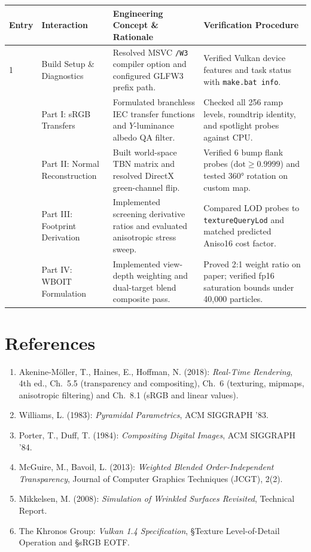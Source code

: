 \documentclass[10pt,a4paper]{article}
\begin{document}
\vspace{0.5em}
\noindent
\begin{center}
\footnotesize
\begin{tabular}{p{}p{}p{}p{}}
\toprule
\textbf{Entry} & \textbf{Interaction} & \textbf{Engineering Concept \& Rationale} & \textbf{Verification Procedure} \\
\midrule
1 & Build Setup \& Diagnostics & Resolved MSVC \texttt{/W3} compiler option and configured GLFW3 prefix path. & Verified Vulkan device features and task status with \texttt{make.bat info}. \\
\addlinespace
2 & Part I: sRGB Transfers & Formulated branchless IEC transfer functions and $Y$-luminance albedo QA filter. & Checked all 256 ramp levels, roundtrip identity, and spotlight probes against CPU. \\
\addlinespace
3 & Part II: Normal Reconstruction & Built world-space TBN matrix and resolved DirectX green-channel flip. & Verified 6 bump flank probes ($\text{dot} \ge 0.9999$) and tested 360° rotation on custom map. \\
\addlinespace
4 & Part III: Footprint Derivation & Implemented screening derivative ratios and evaluated anisotropic stress sweep. & Compared LOD probes to \texttt{textureQueryLod} and matched predicted Aniso16 cost factor. \\
\addlinespace
5 & Part IV: WBOIT Formulation & Implemented view-depth weighting and dual-target blend composite pass. & Proved 2:1 weight ratio on paper; verified fp16 saturation bounds under 40,000 particles. \\
\bottomrule
\end{tabular}
\end{center}

\vspace{1.5em}
\section{References}
\begin{enumerate}
    \item Akenine-M{\"o}ller, T., Haines, E., Hoffman, N. (2018): \emph{Real-Time Rendering}, 4th ed., Ch.~5.5 (transparency and compositing), Ch.~6 (texturing, mipmaps, anisotropic filtering) and Ch.~8.1 (sRGB and linear values).
    \item Williams, L. (1983): \emph{Pyramidal Parametrics}, ACM SIGGRAPH '83.
    \item Porter, T., Duff, T. (1984): \emph{Compositing Digital Images}, ACM SIGGRAPH '84.
    \item McGuire, M., Bavoil, L. (2013): \emph{Weighted Blended Order-Independent Transparency}, Journal of Computer Graphics Techniques (JCGT), 2(2).
    \item Mikkelsen, M. (2008): \emph{Simulation of Wrinkled Surfaces Revisited}, Technical Report.
    \item The Khronos Group: \emph{Vulkan 1.4 Specification}, §Texture Level-of-Detail Operation and §sRGB EOTF.
\end{enumerate}
\end{document}
